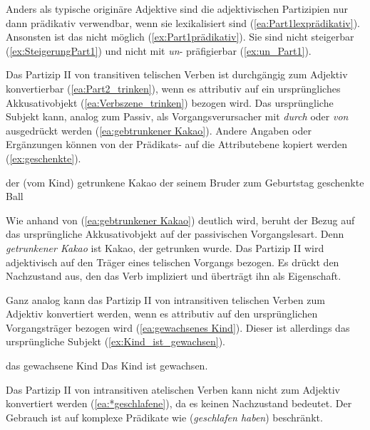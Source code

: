 Anders als typische originäre Adjektive sind die adjektivischen Partizipien nur dann prädikativ verwendbar, wenn sie lexikalisiert sind (\ref{ea:Part1lexprädikativ}). Ansonsten ist das nicht möglich (\ref{ex:Part1prädikativ}). Sie sind nicht steigerbar (\ref{ex:SteigerungPart1}) und nicht mit \textit{un}- präfigierbar (\ref{ex:un_Part1}).

\ea \label{ea_Partizip1_untypAdjektiv}
\label{ea:Part1lexprädikativ}
\label{ex:Part1prädikativ}
\label{ex:SteigerungPart1}
\label{ex:un_Part1}
\z 
\z  

Das Partizip II von transitiven telischen Verben ist durchgängig zum Adjektiv konvertierbar (\ref{ea:Part2_trinken}), wenn es attributiv auf ein ursprüngliches Akkusativobjekt (\ref{ea:Verbszene_trinken}) bezogen wird. Das ursprüngliche Subjekt kann, analog zum Passiv, als Vorgangsverursacher mit \textit{durch} oder \textit{von} ausgedrückt werden (\ref{ea:gebtrunkener Kakao}). Andere Angaben oder Ergänzungen können von der Prädikats- auf die Attributebene kopiert werden (\ref{ex:geschenkte}). 

\ea \label{ea:Part2_trinken}
\ea \label{ea:gebtrunkener Kakao} der (vom Kind) getrunkene Kakao
\ex \label{ex:geschenkte} der seinem Bruder zum Geburtstag geschenkte Ball
\z 
\z 

Wie anhand von (\ref{ea:gebtrunkener Kakao}) deutlich wird, beruht der Bezug auf das ursprüngliche Akkusativobjekt auf der passivischen Vorgangslesart. Denn \textit{getrunkener Kakao} ist Kakao, der getrunken wurde. Das Partizip II wird adjektivisch auf den Träger eines telischen Vorgangs bezogen. Es drückt den Nachzustand aus, den das Verb impliziert und überträgt ihn als Eigenschaft. 

Ganz analog kann das Partizip II von intransitiven telischen Verben zum Adjektiv konvertiert werden, wenn es attributiv auf den ursprünglichen Vorgangsträger bezogen wird (\ref{ea:gewachsenes Kind}). Dieser ist allerdings das ursprüngliche Subjekt (\ref{ex:Kind_ist_gewachsen}). 

\ea \label{ea:Part2_gewachsen_geschlafen}
\ea \label{ea:gewachsenes Kind} das gewachsene Kind
\ex \label{ex:Kind_ist_gewachsen} Das Kind ist gewachsen.
\z 
\z 

Das Partizip II von intransitiven atelischen Verben kann nicht zum Adjektiv konvertiert werden (\ref{ea:*geschlafene}), da es keinen Nachzustand bedeutet. Der Gebrauch ist auf komplexe Prädikate wie (\textit{geschlafen haben}) beschränkt.

